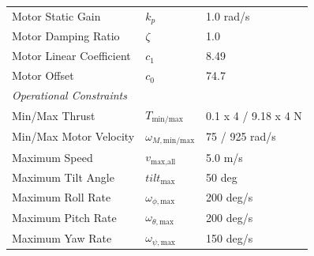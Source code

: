 \documentclass[pdflatex,sn-basic]{sn-jnl}%
\begin{document}
\begin{appendices}
\begin{table}
{\begin{minipage}{1.3\textwidth}
\begin{minipage}{0.55\linewidth}
{\begin{tabular}{l l l}
                            Motor Static Gain & $k_p$ & 1.0 rad/s \\
                            Motor Damping Ratio & $\zeta$ & 1.0 \\
                            Motor Linear Coefficient & $c_1$ & 8.49 \\
                            Motor Offset & $c_0$ & 74.7 \\
                            \midrule
                            \multicolumn{3}{l}{\textit{Operational Constraints}} \\
                            \midrule
                            Min/Max Thrust & $T_{\text{min/max}}$ & 0.1 x 4 / 9.18 x 4 N \\
                            Min/Max Motor Velocity & $\omega_{M,\text{min/max}}$ & 75 / 925 rad/s \\
                            Maximum Speed & $v_{\text{max,all}}$ & 5.0 m/s \\
                            Maximum Tilt Angle & $tilt_{\text{max}}$ & 50 deg \\
                            Maximum Roll Rate & $\omega_{\phi,\text{max}}$ & 200 deg/s \\
                            Maximum Pitch Rate & $\omega_{\theta,\text{max}}$ & 200 deg/s \\
                            Maximum Yaw Rate & $\omega_{\psi,\text{max}}$ & 150 deg/s \\
                            \bottomrule
                        \end{tabular}%
                        }
                \end{minipage}
                \hfill %
                \begin{minipage}{0.41\linewidth}
                    \centering
                    \label{tab:low_level_params}
                    \small
\end{minipage}
\end{minipage}}
\end{table}
\end{appendices}
\end{document}
